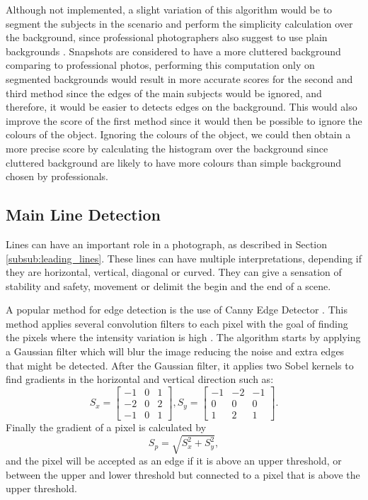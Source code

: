 Although not implemented, a slight variation of this algorithm would be to segment the subjects in the scenario and perform the simplicity calculation over the background, since professional photographers also suggest to use plain backgrounds \cite{Santos}. Snapshots are considered to have a more cluttered background comparing to professional photos, performing this computation only on segmented backgrounds would result in more accurate scores for the second and third method since the edges of the main subjects would be ignored, and therefore, it would be easier to detects edges on the background. This would also improve the score of the first method since it would then be possible to ignore the colours of the object. Ignoring the colours of the object, we could then obtain a more precise score by calculating the histogram over the background since cluttered background are likely to have more colours than simple background chosen by professionals.

\subsection{Main Line Detection}
\label{sub:line_detection}

Lines can have an important role in a photograph, as described in Section \ref{subsub:leading_lines}. These lines can have multiple interpretations, depending if they are horizontal, vertical, diagonal or curved. They can give a sensation of stability and safety, movement or delimit the begin and the end of a scene.

A popular method for edge detection is the use of Canny Edge Detector \cite{canny1986computational}. This method applies several convolution filters to each pixel with the goal of finding the pixels where the intensity variation is high \cite{nobrega2013interactive}.
The algorithm starts by applying a Gaussian filter which will blur the image reducing the noise and extra edges that might be detected. After the Gaussian filter, it applies two Sobel kernels to find gradients in the horizontal and vertical direction such as:
\begin{equation}
S_{x} =
\begin{bmatrix}
	-1 & 0 & 1\\
	-2 & 0 & 2\\
	-1 & 0 & 1
\end{bmatrix}
,
S_{y} = 
\begin{bmatrix}
	-1 & -2 & -1\\
	0 & 0 & 0\\
	1 & 2 & 1
\end{bmatrix}.
\end{equation}
Finally the gradient of a pixel is calculated by
\begin{equation}
	S_{p} = \sqrt{S_{x}^{2} + S_{y}^{2}},
\end{equation}
and the pixel will be accepted as an edge if it is above an upper threshold, or between the upper and lower threshold but connected to a pixel that is above the upper threshold.

